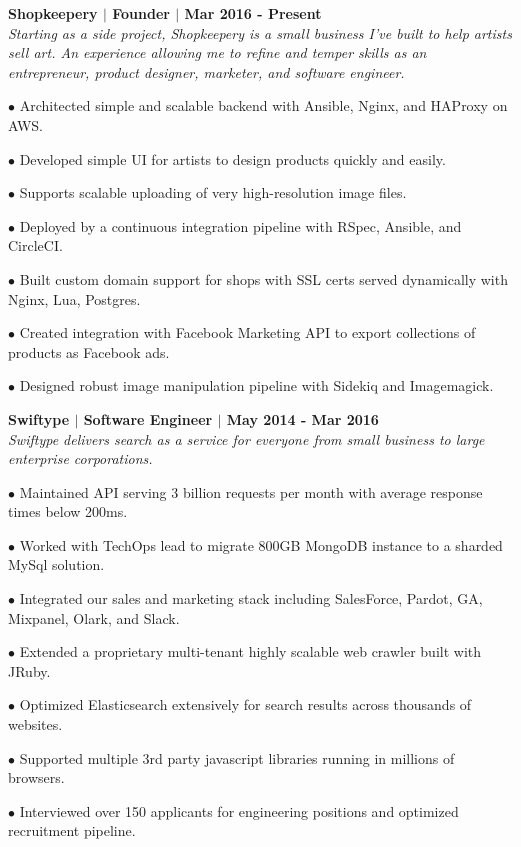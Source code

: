 \documentclass{article}
\begin{document}
	\begin{description}
	
	 \item \textbf{Shopkeepery $|$ Founder $|$ Mar 2016 - Present} \\
	 \textit{Starting as a side project, Shopkeepery is a small business I've built to help artists sell art. 
	 An experience allowing me to refine and temper skills as an entrepreneur, product designer, marketer, and software engineer.}
	 
	 \item$\bullet$ Architected simple and scalable backend with Ansible, Nginx, and HAProxy on AWS.
	 \item$\bullet$ Developed simple UI for artists to design products quickly and easily.
	 
	 \item$\bullet$ Supports scalable uploading of very high-resolution image files.
	 \item$\bullet$ Deployed by a continuous integration pipeline with RSpec, Ansible, and CircleCI.
	 \item$\bullet$ Built custom domain support for shops with SSL certs served dynamically with Nginx, Lua, Postgres.
	 \item$\bullet$ Created integration with Facebook Marketing API to export collections of products as Facebook ads.
	 \item$\bullet$ Designed robust image manipulation pipeline with Sidekiq and Imagemagick.
	
	 \item \textbf{Swiftype $|$ Software Engineer $|$ May 2014 - Mar 2016} \\
	 \textit{Swiftype delivers search as a service for everyone from small business to large enterprise corporations.}
	 
	 \item$\bullet$ Maintained API serving 3 billion requests per month with average response times below 200ms.
	 \item$\bullet$ Worked with TechOps lead to migrate 800GB MongoDB instance to a sharded MySql solution.
	 \item$\bullet$ Integrated our sales and marketing stack including SalesForce, Pardot, GA, Mixpanel, Olark, and Slack.
	 \item$\bullet$ Extended a proprietary multi-tenant highly scalable web crawler built with JRuby.
	 \item$\bullet$ Optimized Elasticsearch extensively for search results across thousands of websites.
	 \item$\bullet$ Supported multiple 3rd party javascript libraries running in millions of browsers.
	 \item$\bullet$ Interviewed over 150 applicants for engineering positions and optimized recruitment pipeline. 
	

\end{description}
\end{document}
